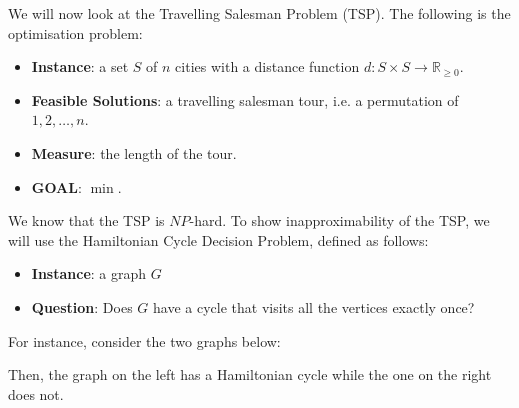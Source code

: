 \documentclass[a4paper, openany]{memoir}
\begin{document}
    We will now look at the Travelling Salesman Problem (TSP). The following is the optimisation problem:
    \begin{itemize}
        \item \textbf{Instance}: a set $S$ of $n$ cities with a distance function $d \colon S \times S \to \mathbb{R}_{\geq 0}$.
        \item \textbf{Feasible Solutions}: a travelling salesman tour, i.e. a permutation of $1, 2, \dots, n$.
        \item \textbf{Measure}: the length of the tour.
        \item \textbf{GOAL}: $\min$.
    \end{itemize}
    We know that the TSP is $NP$-hard. To show inapproximability of the TSP, we will use the Hamiltonian Cycle Decision Problem, defined as follows:
    \begin{itemize}
        \item \textbf{Instance}: a graph $G$
        \item \textbf{Question}: Does $G$ have a cycle that visits all the vertices exactly once?
    \end{itemize}
    For instance, consider the two graphs below:
    \begin{figure}[H]
        \centering
        \begin{subfigure}[a]{0.45\textwidth}
            \centering
        \end{subfigure}
        \hfill
        \begin{subfigure}[a]{0.45\textwidth}
            \centering
        \end{subfigure}
    \end{figure}
    \noindent Then, the graph on the left has a Hamiltonian cycle while the one on the right does not.
\end{document}
